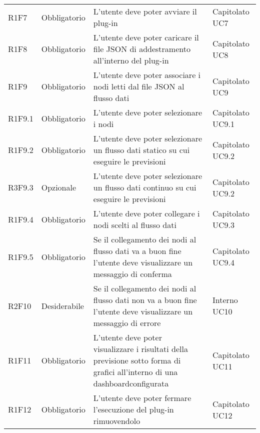 \begin{longtable} {
		>{}p{24mm} 
		>{}p{32mm}
		>{}p{40mm} 
		>{}p{24.5mm}
		}
		R1F7 & Obbligatorio & L'utente deve poter avviare il plug-in & Capitolato UC7 \TBstrut \\ [2mm]
		R1F8 & Obbligatorio & L'utente deve poter caricare il file JSON di addestramento all'interno del plug-in & Capitolato UC8 \TBstrut \\ [2mm]
		R1F9 & Obbligatorio & L'utente deve poter associare i nodi letti dal file JSON al flusso dati & Capitolato UC9 \TBstrut \\ [2mm]
		R1F9.1 & Obbligatorio & L'utente deve poter selezionare i nodi & Capitolato UC9.1 \TBstrut \\ [2mm]
		R1F9.2 & Obbligatorio & L'utente deve poter selezionare un flusso dati statico su cui eseguire le previsioni & Capitolato UC9.2 \TBstrut \\ [2mm]
		R3F9.3 & Opzionale & L'utente deve poter selezionare un flusso dati continuo su cui eseguire le previsioni & Capitolato UC9.2 \TBstrut \\ [2mm]
		R1F9.4 & Obbligatorio & L'utente deve poter collegare i nodi scelti al flusso dati& Capitolato UC9.3 \TBstrut \\ [2mm]
		R1F9.5 & Obbligatorio & Se il collegamento dei nodi al flusso dati va a buon fine l'utente deve visualizzare un messaggio di conferma & Capitolato UC9.4 \TBstrut \\ [2mm]
		R2F10 & Desiderabile & Se il collegamento dei nodi al flusso dati non va a buon fine l'utente deve visualizzare un messaggio di errore & Interno UC10 \TBstrut \\ [2mm]
		R1F11 & Obbligatorio & L'utente deve poter visualizzare i risultati della previsione sotto forma di grafici all'interno di una dashboard\glosp configurata & Capitolato UC11 \TBstrut \\ [2mm]
		R1F12 & Obbligatorio & L'utente deve poter fermare l'esecuzione del plug-in rimuovendolo & Capitolato UC12 \TBstrut \\ [2mm]		
		

\end{longtable}
